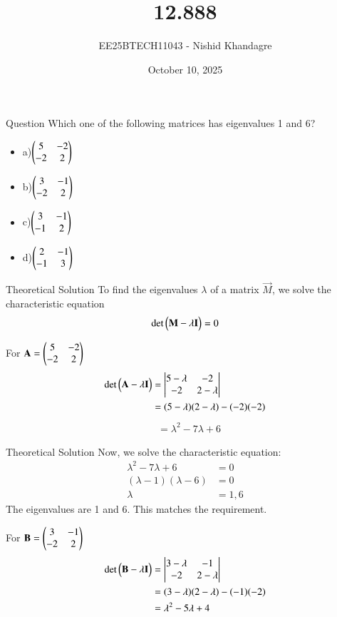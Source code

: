 \documentclass{beamer}
\title
{12.888}
\date{October 10, 2025}
\author
{EE25BTECH11043 - Nishid Khandagre}
\begin{document}
\frame{\titlepage}

\begin{frame}{Question}
Which one of the following matrices has eigenvalues 1 and 6?

\begin{itemize}
\item a)$\begin{pmatrix}5&-2\\-2&2\end{pmatrix}$
\item b)$\begin{pmatrix}3&-1\\-2&2\end{pmatrix}$
\item c)$\begin{pmatrix}3&-1\\-1&2\end{pmatrix}$
\item d)$\begin{pmatrix}2&-1\\-1&3\end{pmatrix}$
\end{itemize}
\end{frame}

\begin{frame}{Theoretical Solution}
To find the eigenvalues $\lambda$ of a matrix $\vec{M}$, we solve the characteristic equation 
\begin{align}
\det\begin{pmatrix}\mathbf{M} - \lambda \mathbf{I}\end{pmatrix} = 0
\end{align}

For $\mathbf{A}=\begin{pmatrix}5 & -2 \\ -2 & 2\end{pmatrix}$
\begin{align}
\det\begin{pmatrix}\mathbf{A} - \lambda \mathbf{I}\end{pmatrix} &= \begin{vmatrix}
5-\lambda & -2\\
-2 & 2-\lambda
\end{vmatrix} \\
&= (5-\lambda)(2-\lambda)-(-2)(-2)
\end{align}
\begin{align}
&= \lambda^2 - 7\lambda + 6
\end{align}
\end{frame}

\begin{frame}{Theoretical Solution}
Now, we solve the characteristic equation:
\begin{align}
\lambda^2 - 7\lambda + 6 &= 0 \\
(\lambda - 1)(\lambda - 6) &= 0 \\
\lambda &= 1, 6
\end{align}
The eigenvalues are 1 and 6. This matches the requirement.

For $\mathbf{B}=\begin{pmatrix}3 & -1 \\ -2 & 2\end{pmatrix}$
\begin{align}
\det\begin{pmatrix}\mathbf{B} - \lambda \mathbf{I}\end{pmatrix} &= \begin{vmatrix}
3-\lambda & -1\\
-2 & 2-\lambda
\end{vmatrix} \\
&= (3-\lambda)(2-\lambda)-(-1)(-2) \\
&= \lambda^2 - 5\lambda + 4
\end{align}
\end{frame}
\end{document}
